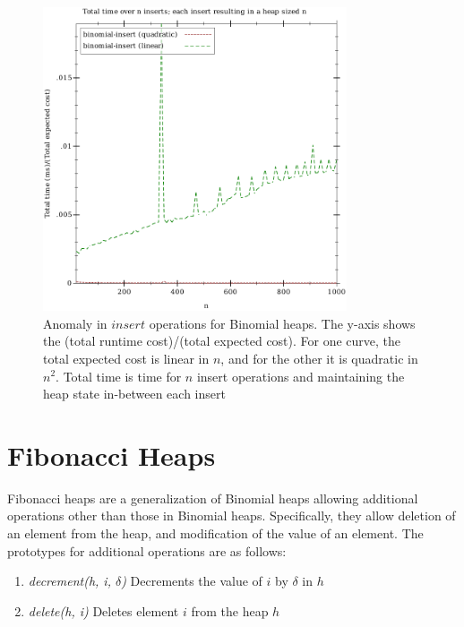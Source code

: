 \documentclass{llncs}
\begin{document}
\begin{figure}
\begin{center}
	\includegraphics[width=0.8\textwidth]{FIG/insert_binomial.pdf}
\end{center}
\caption{Anomaly in $insert$ operations for Binomial heaps. The y-axis shows the (total runtime cost)/(total expected cost). For one curve, the total expected cost is linear in $n$, and for the other it is quadratic in $n^2$. Total time is time for $n$ insert operations and maintaining the heap state in-between each insert}
\label{fig:bino_anomaly}
\end{figure}

\section{Fibonacci Heaps}
Fibonacci heaps are a generalization of Binomial heaps allowing additional operations other than those in Binomial heaps. Specifically, they allow deletion of an element from the heap, and modification of the value of an element. The prototypes for additional operations are as follows: \\

\begin{enumerate}
	\item \emph{decrement(h, i, $\delta$)} Decrements the value of $i$ by $\delta$ in $h$
	\item \emph{delete(h, i)} Deletes element $i$ from the heap $h$ 
\end{enumerate}
\end{document}
